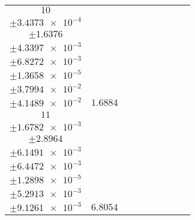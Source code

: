 \documentclass[8pt]{article}
\begin{document}
\begin{longtable}[l]{c c c c c c c c c}
$\num{10}$ & \begin{tabular}[c]{@{}c@{}}$\num{9.7472e-3}$ \\ $\pm\num{3.4373e-4}$\end{tabular} & \begin{tabular}[c]{@{}c@{}}$\num{1.5796}$ \\ $\pm\num{1.6376}$\end{tabular} & \begin{tabular}[c]{@{}c@{}}$\num{15.79}$ \\ $\pm\num{4.3397e-3}$\end{tabular} & \begin{tabular}[c]{@{}c@{}}$\num{3.5798e+3}$ \\ $\pm\num{6.8272e-3}$\end{tabular} & \begin{tabular}[c]{@{}c@{}}$\num{7.1615}$ \\ $\pm\num{1.3658e-5}$\end{tabular} & \begin{tabular}[c]{@{}c@{}}$\num{0.82319}$ \\ $\pm\num{3.7994e-2}$\end{tabular} & \begin{tabular}[c]{@{}c@{}}$\num{0.94284}$ \\ $\pm\num{4.1489e-2}$\end{tabular} & $\num{1.6884}$\\
$\num{11}$ & \begin{tabular}[c]{@{}c@{}}$\num{2.6412e-2}$ \\ $\pm\num{1.6782e-3}$\end{tabular} & \begin{tabular}[c]{@{}c@{}}$\num{1.1223}$ \\ $\pm\num{2.8964}$\end{tabular} & \begin{tabular}[c]{@{}c@{}}$\num{-3.0362}$ \\ $\pm\num{6.1491e-3}$\end{tabular} & \begin{tabular}[c]{@{}c@{}}$\num{3.5799e+3}$ \\ $\pm\num{6.4472e-3}$\end{tabular} & \begin{tabular}[c]{@{}c@{}}$\num{7.1618}$ \\ $\pm\num{1.2898e-5}$\end{tabular} & \begin{tabular}[c]{@{}c@{}}$\num{0.58215}$ \\ $\pm\num{5.2913e-3}$\end{tabular} & \begin{tabular}[c]{@{}c@{}}$\num{0.61803}$ \\ $\pm\num{9.1261e-3}$\end{tabular} & $\num{6.8054}$\\

\end{longtable}
\end{document}
